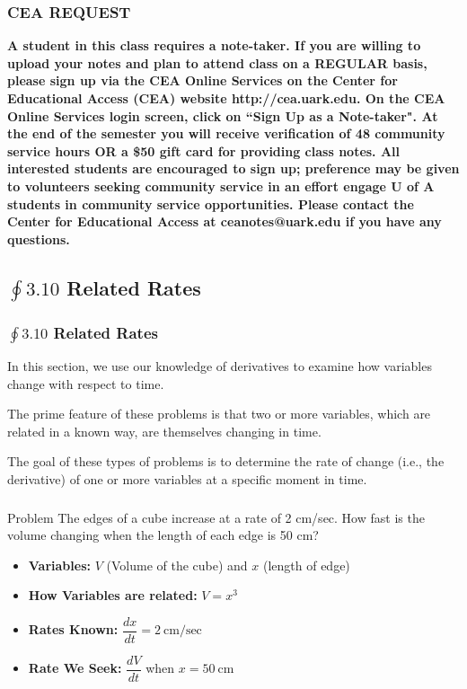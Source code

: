 \documentclass[14pt]{beamer}
\begin{document}
\begin{frame}
\frametitle{CEA REQUEST}
\footnotesize {\bf
A student in this class requires a note-taker. If you are willing to upload your notes and plan to attend class on a REGULAR basis, please sign up via the CEA Online Services on the Center for Educational Access (CEA) website http://cea.uark.edu. On the CEA Online Services login screen, click on ``Sign Up as a Note-taker". At the end of the semester you will receive verification of 48 community service hours OR a \$50 gift card for providing class notes. All interested students are encouraged to sign up; preference may be given to volunteers seeking community service in an effort engage U of A students in community service opportunities. Please contact the Center for Educational Access at ceanotes@uark.edu if you have any questions.}
\end{frame}

\begin{frame}
\subsection[$\oint 3.10$ Related Rates]{$\oint 3.10$ Related Rates}
\frametitle{$\oint 3.10$ Related Rates}
\small 
In this section, we use our knowledge of derivatives to examine how variables change with respect to time.

\vspace{1pc}
The prime feature of these problems is that two or more variables, which are related in a known way, are themselves changing in time.

\vspace{1pc}
The goal of these types of problems is to determine the rate of change (i.e., the derivative) of one or more variables at a specific moment in time.
\end{frame}

\begin{frame}
\frametitle{}
\begin{block}{Problem}
The edges of a cube increase at a rate of 2 cm/sec.  How fast is the volume changing when the length of each edge is 50 cm?
\end{block}
\small
\begin{itemize}
\item {\bf Variables:}  $V$ (Volume of the cube) and $x$ (length of edge)
\item {\bf How Variables are related:}  $V=x^3$
\item {\bf Rates Known:}  $\dfrac{dx}{dt}=2\ \text{cm/sec}$
\item {\bf Rate We Seek:}  $\dfrac{dV}{dt}$ when $x=50\ \text{cm}$
\end{itemize}
\end{frame}
\end{document}
